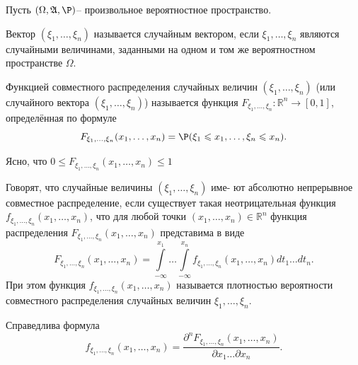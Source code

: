 
Пусть $(\Omega,\mathfrak{A},\P)$-- произвольное вероятностное пространство.

\begin{definition}
	Вектор $(\xi_1, \dots, \xi_n)$ называется случайным вектором, если $\xi_1, \dots, \xi_n$ являются случайными величинами, заданными на одном
и том же вероятностном пространстве $\Omega$.
\end{definition}

\begin{definition}
	Функцией совместного распределения случайных
величин $(\xi_1, \dots, \xi_n)$ (или случайного вектора $(\xi_1, \dots, \xi_n)$) называется функция $F_{\xi_1, \dots, \xi_n} : \mathbb{R}^n \rightarrow [0, 1]$, определённая по формуле
\begin{equation*}
	F_{\xi_1, \dots, \xi_n}(x_1,\dots,x_n)=\P(\xi_1\leqslant x_1,\dots,\xi_n\leqslant x_n).
\end{equation*}

Ясно, что $0 \leqslant F_{\xi_1, \dots, \xi_n}(x_1,\dots,x_n) \leqslant 1$

\end{definition}

\begin{definition}
	Говорят, что случайные величины $(\xi_1, \dots, \xi_n)$ име-
ют абсолютно непрерывное совместное распределение, если существует
такая неотрицательная функция $f_{\xi_1, \dots, \xi_n}(x_1,\dots,x_n)$, что для любой точки
$(x_1,\dots,x_n)\in\mathbb{R}^n$ функция распределения $F_{\xi_1, \dots, \xi_n}(x_1,\dots,x_n)$ представима в
виде
\begin{equation*}
\label{def:15.3}
	F_{\xi_1, \dots, \xi_n}(x_1,\dots,x_n)=\int\limits_{-\infty}^{x_1}\ldots
	\int\limits_{-\infty}^{x_n}f_{\xi_1, \dots, \xi_n}(x_1,\dots,x_n)dt_1\ldots dt_n.
\end{equation*}
При этом функция $f_{\xi_1, \dots, \xi_n}(x_1,\dots,x_n)$ называется плотностью вероятности совместного распределения случайных величин ${\xi_1, \dots, \xi_n}$.
\end{definition}

\begin{lemma}
Справедлива формула
	\begin{equation*}
		f_{\xi_1, \dots, \xi_n}(x_1,\dots,x_n)=\frac
		{\partial^nF_{\xi_1, \dots, \xi_n}(x_1,\dots,x_n)}
		{\partial x_1\ldots \partial x_n}.
	\end{equation*}
\end{lemma}


